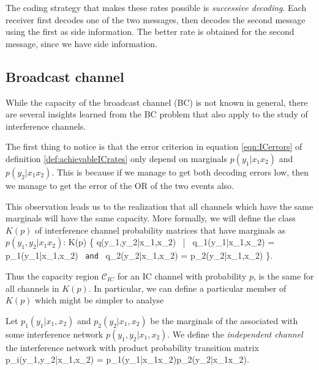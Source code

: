 \documentclass[aps,11pt,twoside,letterpaper]{article}
\newcommand{\ICcap}{  \ensuremath{\mathcal C}_{IC} }
\begin{document}
	The coding strategy that makes these rates possible is \emph{successive decoding}.
	Each receiver first decodes one of the two messages, then decodes the second
	message using the first as side information. 
	The better rate is obtained for the second message, since we have side information.
	

    \subsection{Broadcast channel}
        
        While the capacity of the broadcast channel (BC) is not known in general,
        there are several insights learned from the BC problem that also apply to the
        study of interference channels.
        
        The first thing to notice is that the error criterion in equation \eqref{eqn:ICerrors}
        of definition \ref{def:achievableICrates} only depend on marginals 
        $p(y_1|x_1x_2)$ and $p(y_2|x_1x_2)$.
        This is because if we manage to get both decoding errors low,
        then we manage to get the error of the OR of the two events also.
        
        This observation leads us to the realization that all channels which have
        the same marginals will have the same capacity. More formally, we will define
        the class $K(p)$ of interference channel probability matrices 
        that have marginals as $p(y_1,y_2|x_1x_2)$:
        \be
 		\label{eqn:Kp}
        		K(p) \triangleq \{ q(y_1,y_2|x_1,x_2) \  \big| \ q_1(y_1|x_1,x_2) = p_1(y_1|x_1,x_2) \ \texttt{and}  \
					q_2(y_2|x_1,x_2) = p_2(y_2|x_1,x_2) \}.
        \ee
        
        Thus the capacity region $\ICcap$ for an IC channel with probability $p$, is the 
        same for all channels in $K(p)$.
        In particular, we can define a particular member of $K(p)$ which might be simpler to analyse
        \begin{definition}
            Let $p_1(y_1|x_1,x_2)$ and $p_2(y_2|x_1,x_2)$ be the marginals of the associated
            with some interference network $p(y_1,y_2|x_1,x_2)$.
            We define the \emph{independent channel} the interference network with 
            product probability transition matrix
            \be
                p_i(y_1,y_2|x_1,x_2) = p_1(y_1|x_1x_2)p_2(y_2|x_1x_2).
            \ee
        \end{definition}
\end{document}
